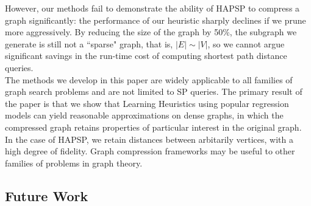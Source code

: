 \documentclass[10.5pt,journal]{IEEEtran}
\begin{document}
		However, our methods fail to demonstrate the ability of HAPSP to compress a graph 
		significantly: the performance of our heuristic sharply declines if we prune more aggressively.
		By reducing the size of the graph by 50$\%$, the subgraph we generate is still not a ``sparse"
		graph, that is, $|E| \sim |V|$, so we cannot argue significant savings in the run-time cost of
		computing shortest path distance queries. \\
		
		The methods we develop in this paper are widely applicable to all families of graph search
		problems and are not limited to SP queries. The primary result of the paper is that we
		show that Learning Heuristics using popular regression models can yield reasonable
		approximations on dense graphs, in which the compressed graph retains properties of
		particular interest in the original graph. In the case of HAPSP, we retain distances between
		arbitarily vertices, with a high degree of fidelity. Graph compression frameworks may be
		useful to other families of problems in graph theory.
	\subsection{Future Work}
\end{document}
